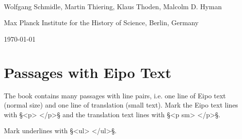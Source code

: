 \documentclass[fontsize=11pt, paper=a4, 
DIV15,
normalheadings,
parskip=half-, 
pointlessnumbers]{scrartcl}
\begin{document}
\begin{center}
{} \\[5mm]
\large Wolfgang Schmidle, Martin Thiering, Klaus Thoden, Malcolm D. Hyman

\normalsize Max Planck Institute for the History of Science, Berlin, Germany

\today
\end{center}

\section{Passages with Eipo Text}

\begin{mainrule}
The book contains many passages with line pairs, i.e. one line of Eipo text (normal size) and one line of translation (small text).  Mark the Eipo text lines with §<p> </p>§ and the translation text lines with §<p sm> </p>§.
\end{mainrule}

\begin{clarification}
Mark underlines with §<ul> </ul>§.
\end{clarification}
\end{document}

